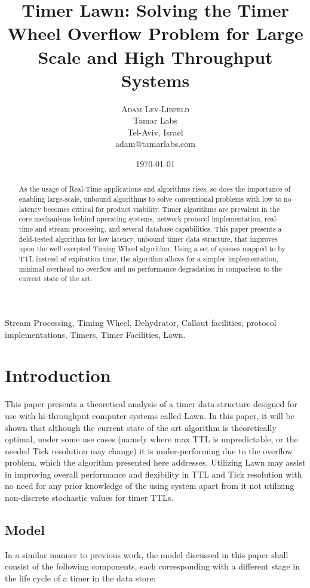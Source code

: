 \documentclass[conference]{IEEEtran}
\title{Timer Lawn: Solving the Timer Wheel Overflow Problem for Large Scale and High Throughput Systems}
\author{
	\textsc{Adam Lev-Libfeld} \\[1ex]
	\normalsize Tamar Labs \\
	\normalsize Tel-Aviv, Israel \\
	\normalsize{adam@tamarlabs.com}
}
\date{\today}
\begin{document}
\maketitle

\begin{abstract}
As the usage of Real-Time applications and algorithms rises, so does the importance of enabling large-scale, unbound algorithms to solve conventional problems with low to no latency becomes critical for product viability\cite{REND, WHT}. Timer algorithms are prevalent in the core mechanisms behind operating systems\cite{BSD}, network protocol implementation, real-time and stream processing, and several database capabilities. This paper presents a field-tested algorithm for low latency, unbound timer data structure, that improves upon the well excepted Timing Wheel algorithm. Using a set of queues mapped to by TTL instead of expiration time, the algorithm allows for a simpler implementation, minimal overhead no overflow and no performance degradation in comparison to the current state of the art.
\end{abstract}

\begin{IEEEkeywords}
Stream Processing, Timing Wheel, Dehydrator, Callout facilities, protocol implementations, Timers, Timer Facilities, Lawn.
\end{IEEEkeywords}

\section{Introduction}
This paper presents a theoretical analysis of a timer data-structure designed for use with hi-throughput computer systems called Lawn. In this paper, it will be shown that although the current state of the art algorithm is theoretically optimal, under some use cases (namely where max TTL is unpredictable, or the needed Tick resolution may change) it is under-performing due to the overflow problem, which the algorithm presented here addresses. Utilizing Lawn may assist in improving overall performance and flexibility in TTL and Tick resolution with no need for any prior knowledge of the using system apart from it not utilizing non-discrete stochastic values for timer TTLs.
\subsection{Model}
In a similar manner to previous work\cite{TW, CQ, EMP}, the model discussed in this paper shall consist of the following components, each corresponding with a different stage in the life cycle of a timer in the data store:
\end{document}
